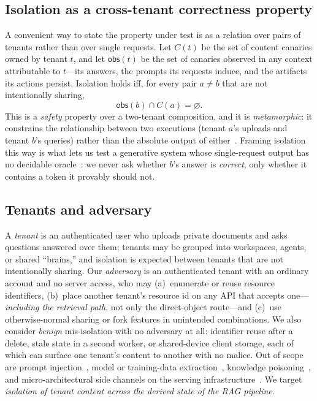 \IfFileExists{IEEEtran.cls}{\documentclass[conference]{IEEEtran}}{\documentclass[10pt,twocolumn]{article}}
\begin{document}
\subsection{Isolation as a cross-tenant correctness property}
A convenient way to state the property under test is as a relation over pairs of tenants rather than
over single requests. Let $C(t)$ be the set of content canaries owned by tenant $t$, and let
$\mathsf{obs}(t)$ be the set of canaries observed in any context attributable to $t$---its answers,
the prompts its requests induce, and the artifacts its actions persist. Isolation holds iff, for
every pair $a\neq b$ that are not intentionally sharing,
\[
\mathsf{obs}(b)\cap C(a)=\varnothing .
\]
This is a \emph{safety} property over a two-tenant composition, and it is \emph{metamorphic}: it
constrains the relationship between two executions (tenant $a$'s uploads and tenant $b$'s queries)
rather than the absolute output of either~\cite{chen2018metamorphic,segura2016metamorphic}. Framing
isolation this way is what lets us test a generative system whose single-request output has no
decidable oracle~\cite{barr2015oracle}: we never ask whether $b$'s answer is \emph{correct}, only
whether it contains a token it provably should not.

\subsection{Tenants and adversary}
A \emph{tenant} is an authenticated user who uploads private documents and asks questions answered
over them; tenants may be grouped into workspaces, agents, or shared ``brains,'' and isolation is
expected between tenants that are not intentionally sharing. Our \emph{adversary} is an
authenticated tenant with an ordinary account and no server access, who may (a)~enumerate or reuse
resource identifiers, (b)~place another tenant's resource id on any API that accepts
one---\emph{including the retrieval path}, not only the direct-object route---and (c)~use
otherwise-normal sharing or fork features in unintended combinations. We also consider \emph{benign}
mis-isolation with no adversary at all: identifier reuse after a delete, stale state in a second
worker, or shared-device client storage, each of which can surface one tenant's content to another
with no malice. Out of scope are prompt injection~\cite{greshake2023indirect}, model or
training-data extraction~\cite{carlini2021extracting}, knowledge
poisoning~\cite{zou2025poisonedrag}, and micro-architectural side channels on the serving
infrastructure~\cite{zhang2012crossvm}. We target \emph{isolation of tenant content across the
derived state of the RAG pipeline}.
\end{document}
